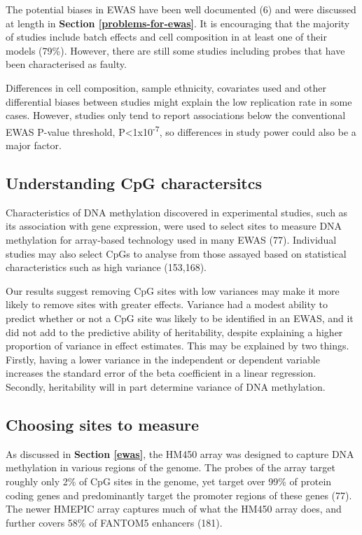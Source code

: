 \documentclass[11pt,twoside]{bristolthesis}
\begin{document}
The potential biases in EWAS have been well documented (6) and were discussed at length in \textbf{Section \ref{problems-for-ewas}}. It is encouraging that the majority of studies include batch effects and cell composition in at least one of their models (79\%). However, there are still some studies including probes that have been characterised as faulty.

Differences in cell composition, sample ethnicity, covariates used and other differential biases between studies might explain the low replication rate in some cases. However, studies only tend to report associations below the conventional EWAS P-value threshold, P\textless1x10\textsuperscript{-7}, so differences in study power could also be a major factor.

\hypertarget{understanding-cpg-characteristics}{%
\subsection{Understanding CpG charactersitcs}\label{understanding-cpg-characteristics}}

Characteristics of DNA methylation discovered in experimental studies, such as its association with gene expression, were used to select sites to measure DNA methylation for array-based technology used in many EWAS (77). Individual studies may also select CpGs to analyse from those assayed based on statistical characteristics such as high variance (153,168).

Our results suggest removing CpG sites with low variances may make it more likely to remove sites with greater effects. Variance had a modest ability to predict whether or not a CpG site was likely to be identified in an EWAS, and it did not add to the predictive ability of heritability, despite explaining a higher proportion of variance in effect estimates. This may be explained by two things. Firstly, having a lower variance in the independent or dependent variable increases the standard error of the beta coefficient in a linear regression. Secondly, heritability will in part determine variance of DNA methylation.

\hypertarget{choosing-sites-to-measure}{%
\subsection{Choosing sites to measure}\label{choosing-sites-to-measure}}

As discussed in \textbf{Section \ref{ewas}}, the HM450 array was designed to capture DNA methylation in various regions of the genome. The probes of the array target roughly only 2\% of CpG sites in the genome, yet target over 99\% of protein coding genes and predominantly target the promoter regions of these genes (77). The newer HMEPIC array captures much of what the HM450 array does, and further covers 58\% of FANTOM5 enhancers (181).
\end{document}
